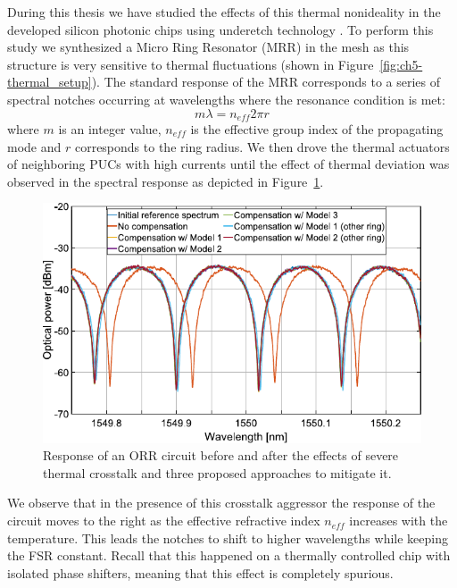 During this thesis we have studied the effects of this thermal nonideality in the developed silicon photonic chips using underetch technology \cite{cem_thermal_2023, teofilovic_thermal_2024}.
To perform this study we synthesized a Micro Ring Resonator (MRR) in the mesh as this structure is very sensitive to thermal fluctuations (shown in Figure~\ref{fig:ch5-thermal_setup}).
The standard response of the MRR corresponds to a series of spectral notches occurring at wavelengths where the resonance condition is met:
\begin{equation}
	m\lambda = n_{eff}2\pi r
	\label{eq:ch5-ring_eq}
\end{equation}
where \(m\) is an integer value, \(n_{eff}\) is the effective group index of the propagating mode and \(r\) corresponds to the ring radius.
We then drove the thermal actuators of neighboring PUCs with high currents until the effect of thermal deviation was observed in the spectral response as depicted in Figure~\ref{fig:ch5-thermal_comp_ring1}.

\begin{figure}
	\begin{center}
		\includegraphics{figures/ch5-thermal_comp_ring1.pdf}
	\end{center}
	\caption{Response of an ORR circuit before and after the effects of severe thermal crosstalk and three proposed approaches to mitigate it.}\label{fig:ch5-thermal_comp_ring1}
\end{figure}

We observe that in the presence of this crosstalk aggressor the response of the circuit moves to the right as the effective refractive index \(n_{eff}\) increases with the temperature.
This leads the notches to shift to higher wavelengths while keeping the FSR constant.
Recall that this happened on a thermally controlled chip with isolated phase shifters, meaning that this effect is completely spurious.

